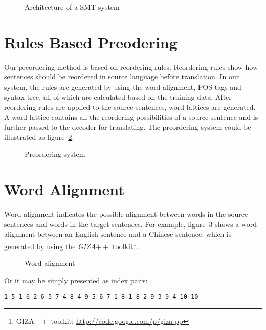 \begin{figure}
\centering
\scalebox{.8}{}
\caption{Architecture of a \ac{SMT} system}
\label{smt}
\end{figure}

\section{Rules Based Preodering}
\label{ch:Foundations:sec:PreReorderingSystem}

Our preordering method is based on reordering rules. Reordering rules show how sentences should be reordered in source language before translation. In our system, the rules are generated by using the word alignment, \ac{POS} tags and syntax tree, all of which are calculated based on the training data. After reordering rules are applied to the source sentences, word lattices are generated. A word lattice contains all the reordering possibilities of a source sentence and is further passed to the decoder for translating. The preordering system could be illustrated as figure~\ref{prereordering}.

\begin{figure}
\centering
\scalebox{.8}{}
\caption{Preordering system}
\label{prereordering}
\end{figure}


\section{Word Alignment}
\label{ch:Foundations:sec:Alignment}
\renewcommand{\thefootnote}{$\star$} 
Word alignment indicates the possible alignment between words in the source sentences and words in the target sentences. For example, figure~\ref{alignment} shows a word alignment between an English sentence and a Chinese sentence, which is generated by using the \textit{GIZA$++$} toolkit\footnote{GIZA$++$ toolkit: \url{http://code.google.com/p/giza-pp}}.

\begin{figure}[H]
\centering
\scalebox{0.95}{}
\caption{Word alignment}
\label{alignment}
\end{figure}
Or it may be simply presented as index pairs:
\begin{center}
\texttt{1-5 1-6 2-6 3-7 4-8 4-9 5-6 7-1 8-1 8-2 9-3 9-4 10-10}
\end{center}

